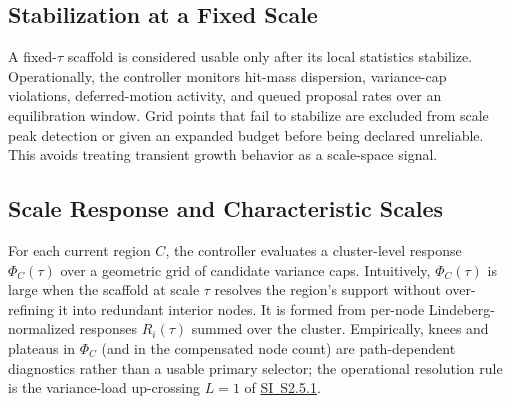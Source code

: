 \documentclass[11pt]{article}
\theoremstyle{definition}
\theoremstyle{plain}
\begin{document}
\subsection{Stabilization at a Fixed Scale}
A fixed-$\tau$ scaffold is considered usable only after its local statistics stabilize. Operationally, the controller monitors hit-mass dispersion, variance-cap violations, deferred-motion activity, and queued proposal rates over an equilibration window. Grid points that fail to stabilize are excluded from scale peak detection or given an expanded budget before being declared unreliable. This avoids treating transient growth behavior as a scale-space signal.

\subsection{Scale Response and Characteristic Scales}
For each current region $C$, the controller evaluates a cluster-level response $\Phi_C(\tau)$ over a geometric grid of candidate variance caps. Intuitively, $\Phi_C(\tau)$ is large when the scaffold at scale $\tau$ resolves the region's support without over-refining it into redundant interior nodes. It is formed from per-node Lindeberg-normalized responses $R_i(\tau)$ summed over the cluster. Empirically, knees and plateaus in $\Phi_C$ (and in the compensated node count) are path-dependent diagnostics rather than a usable primary selector; the operational resolution rule is the variance-load up-crossing $L=1$ of \hyperref[sec:si-scale-response]{SI~S2.5.1}.
\end{document}
